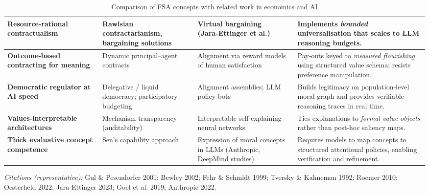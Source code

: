 \begin{table*}[t]
\begin{tabular}{p{}p{}p{}p{}}
\midrule
\textbf{Resource‑rational contractualism} & Rawlsian contractarianism, bargaining solutions & Virtual bargaining (Jara‑Ettinger et al.) & Implements \textit{bounded} universalisation that scales to LLM reasoning budgets. \\
\midrule
\textbf{Outcome‑based contracting for meaning} & Dynamic principal–agent contracts & Alignment via reward models of human satisfaction & Pay‑outs keyed to \textit{measured flourishing} using structured value schema; resists preference manipulation. \\
\midrule
\textbf{Democratic regulator at AI speed} & Delegative / liquid democracy; participatory budgeting & Alignment assemblies; LLM policy bots & Builds legitimacy on population‑level moral graph and provides verifiable reasoning traces in real time. \\
\midrule
\textbf{Values‑interpretable architectures} & Mechanism transparency (auditability) & Interpretable self‑explaining neural networks & Ties explanations to \textit{formal value objects} rather than post‑hoc saliency maps. \\
\midrule
\textbf{Thick evaluative concept competence} & Sen's capability approach & Expression of moral concepts in LLMs (Anthropic, DeepMind studies) & Requires models to map concepts to structured attentional policies, enabling verification and refinement. \\
\bottomrule
\end{tabular}
\caption{Comparison of FSA concepts with related work in economics and AI}
\label{tab:related_work}
\end{table*}

\textit{Citations (representative):} Gul \& Pesendorfer 2001; Bewley 2002; Fehr \& Schmidt 1999; Tversky \& Kahneman 1992; Roemer 2010; Oesterheld 2022; Jara‑Ettinger 2023; Goel et al. 2019; Anthropic 2022.